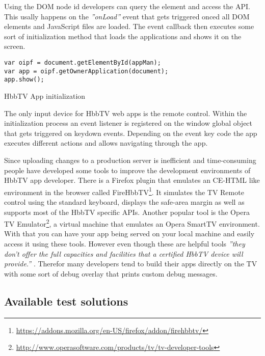Using the DOM node id developers can query the element and access the API. This usally happens
on the \textit{''onLoad''} event that gets triggered onced all DOM elements and JavaScript files
are loaded. The event callback then executes some sort of initialization method that loads the
applications and shows it on the screen.

\vspace{1cm}
\begin{listing}[H]
\begin{verbatim}
var oipf = document.getElementById(appMan);
var app = oipf.getOwnerApplication(document);
app.show();
\end{verbatim}
\caption{HbbTV App initialization}
\label{lst:loadApp}
\end{listing}
\vspace{0.5cm}

The only input device for HbbTV web apps is the remote control. Within the initialization process
an event listener is registered on the window global object that gets triggered on keydown events.
Depending on the event key code the app executes different actions and allows navigating through
the app.

Since uploading changes to a production server is inefficient and time-consuming people have
developed some tools to improve the development environments of HbbTV app developer. There is a
Firefox plugin that emulates an CE-HTML like environment in the browser called FireHbbTV\footnote{\url{https://addons.mozilla.org/en-US/firefox/addon/firehbbtv/}}.
It simulates the TV Remote control using the standard keyboard, displays the safe-area margin as well
as supports most of the HbbTV specific APIs. Another popular tool is the Opera TV Emulator\footnote{\url{http://www.operasoftware.com/products/tv/tv-developer-tools}},
a virtual machine that emulates an Opera SmartTV environment. With that you can have your app being
served on your local machine and easily access it using these tools. However even though these are
helpful tools \textit{''they don't offer the full capacities and facilities that a certified HbbTV
device will provide.''} \cite{hbbtvenv}. Therefor many developers tend to build their apps directly
on the TV with some sort of debug overlay that prints custom debug messages.

\subsection{Available test solutions\label{sec:availabletestsolutions}}

